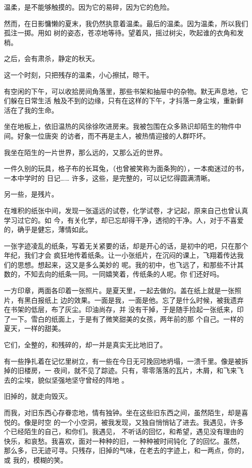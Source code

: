 \documentclass[12pt,a4paper]{article}
\begin{document}
		温柔，是不能够触摸的。因为它的易碎，因为它的危险。

		然而，在日影慵懒的夏末，我仍然执意着温柔。最后的温柔。因为温柔，所以我们孤注一掷。用如
	树的姿态，苍凉地等待。望着风，摇过树尖，吹起谁的衣角和发梢。


		之后，会有肃杀，静定的秋天。

		这一个时刻，只把残存的温柔，小心擦拭，晾干。

	\endwriting



		有空闲的下午，可以收拾房间角落里，那些书架和抽屉中的杂物。默无声息地，它们躲在日常生活
	触及不到的边缘，只有在这样的下午，才抖落一身尘埃，重新鲜活在了我的生命。

		坐在地板上，依旧温热的风徐徐吹进房来。我被包围在众多熟识却陌生的物件中间。好象一位唐突
	的访者，而不再是主人，被热情迎接的人群吓坏。

		我坐在陌生的一片世界，那么远的，又那么近的世界。

		一件久别的玩具，格子布的长耳兔，（也曾被笑称为面条狗的），一本痴迷过的书，一本中学时的
	日记…… 许多，这些，是完整的，可以记忆得圆满清晰。

		另一些，是残片。

		在堆积的纸张中间，发现一张遥远的试卷，化学试卷，才记起，原来自己也曾认真学习过它的。如
	今，有关化学，却已忘却得干净，透彻的干净。人，对于不喜爱的，确乎是健忘，薄情如此。

		一张字迹凌乱的纸条，写着无关紧要的话，却是开心的话，是初中的吧，只在那个年纪，我们才会
	疯狂地传着纸条。让一小张纸片，在沉闷的课上，飞翔着传达我们的思想。想起来，这又是多么美妙的
	呢。我的初中，也飞远了，和那些不计其数的，不知去向的纸条一同。一同嬉笑着，传纸条的人呢。你
	们还好吗。

		一方印章，两面各印着一张照片。是夏天里，一起去做的。盖在纸上就是一张照片，有黑白报纸上
	边的效果。一面是我，一面是他。忘了是什么时候，被我遗弃在书架的低层，布了灰尘。印油尚存，并
	没有干掉，于是随手捡起一张纸来，印了一下。雪白的纸面上，于是有了微笑甜美的女孩，两年前的那
	个自己。一样的夏天，一样的甜美。

		它们，全整的，和残碎的，却一并是真实无比地旧了。

		有一些挣扎着在记忆里树立，有一些在今日无可挽回地坍塌，一溃千里。像是被拆掉的旧楼房，一
	夜间，就不见了踪迹。只有，零零落落的瓦片，木屑，和飞来飞去的尘埃，貌似坚强地坚守曾经的阵地
	。

		旧掉的，就走向毁灭。

		而我，对旧东西心存眷恋地，情有独钟。坐在这些旧东西之间，虽然陌生，却是喜悦的。像是时空
	的一个小空洞，被我发现，又独自悄悄钻了进去。我遇见，许多个已经陌生的自己，和你们。我遇见，
	不听话的回忆，和希望，遇见没有理由的快乐，和哀愁。我喜欢，面对一种种的旧，一种种被时间钝化
	了的回忆。虽然，那么多，已无迹可寻。只残存，旧掉的气味，在老去的字迹上，和一两点，你的，或
	我的，模糊的笑。
\end{document}

